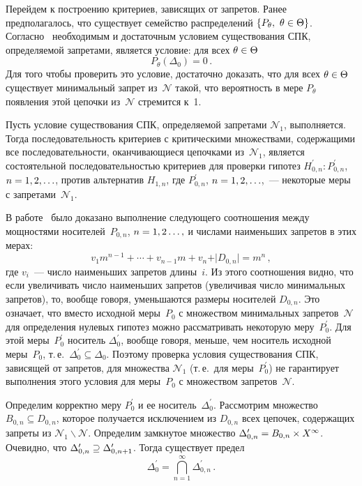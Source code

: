 \begin{multicols}{2}
  Перейдем к построению критериев, зависящих от запретов. Ранее 
предполагалось, что существует семейство распределений $\left\{ P_\theta, \ 
\theta\hm\in\Theta\right\}$. Согласно~\cite{5-gr} необходимым и достаточным 
условием существования СПК, определяемой запретами, является условие: для 
всех $\theta\hm\in\Theta$
  $$
  P_\theta(\Delta_0)=0\,.
  $$
    Для того чтобы проверить это условие, достаточно доказать, что для всех 
$\theta\hm\in\Theta$ существует минимальный запрет из~$\mathcal{N}$ такой, что 
вероятность в мере $P_\theta$ появления этой цепочки из~$\mathcal{N}$ стремится 
к~1. 
  
  Пусть условие существования СПК, опреде\-ля\-емой запретами $\mathcal{N}_1$, 
выполняется. Тогда последовательность критериев с критическими 
множествами, содержащими все последовательности, оканчивающиеся 
цепочками из~$\mathcal{N}_1$, является состоятельной последовательностью критериев 
для проверки гипотез $H_{0,n}^\prime:P_{0,n}^\prime$, $n\hm=1,2,\ldots$, 
против альтернатив $H_{1,n}$, где $P^\prime_{0,n}$, $n\hm=1,2,\ldots$,~--- 
некоторые меры с запретами~$\mathcal{N}_1$. 
  
  В работе~\cite{6-gr} было доказано выполнение следующего соотношения 
между мощностями носителей~$P_{0,n}$, $n\hm=1,2\ldots,$ и числами 
наименьших запретов в этих мерах:
  $$
  v_1 m^{n-1}+\cdots +v_{n-1}m+v_n+\vert D_{0,n}\vert =m^n\,,
  $$
где $v_i$~--- число наименьших запретов длины~$i$. Из этого соотношения 
видно, что если увеличивать число наименьших запретов (увеличивая число 
минимальных запретов), то, вообще говоря, уменьшаются размеры носителей 
$D_{0,n}$. Это означает, что вместо исходной меры~$P_0$ с множеством 
минимальных запретов~$\mathcal{N}$ для определения нулевых гипотез можно 
рассматривать некоторую меру~$P^\prime_0$. Для этой меры~$P_0^\prime$ 
носитель $\Delta_0^\prime$, вообще говоря, меньше, чем носитель исходной 
меры~$P_0$, т.\,е.\ $\Delta^\prime_0\subseteq \Delta_0$. Поэтому проверка 
условия существования СПК, зависящей от запретов, для множества 
$\mathcal{N}_1$ (т.\,е.\ для меры~$P^\prime_0$) не гарантирует выполнения этого 
условия для меры~$P_0$ с множеством запретов~$\mathcal{N}$. 
  
  Определим корректно меру $P_0^\prime$ и ее носитель~$\Delta_0^\prime$. 
Рассмотрим множество $B_{0,n}\subseteq D_{0,n}$, которое получается 
исключением из $D_{0,n}$ всех цепочек, содержащих запреты из 
$\mathcal{N}_1\backslash \mathcal{N}$. Определим замкнутое множество 
$\Delta^\prime_{0,n}\hm=B_{0,n}\times X^\infty$. Очевидно, что 
$\Delta^\prime_{0,n}\hm\supseteq \Delta^\prime_{0,n+1}$. Тогда существует 
предел
  $$
  \Delta_0^\prime= \mathop{\bigcap}\limits_{n=1}^\infty \Delta^\prime_{0,n}\,.
  $$
  

\end{multicols}
